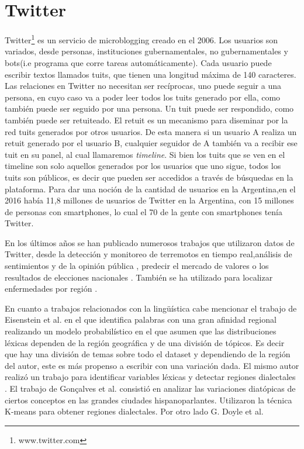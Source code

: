 \section{Twitter}
Twitter\footnote{www.twitter.com} es un servicio de microblogging creado en el 2006. Los usuarios son variados, desde personas, instituciones gubernamentales, no gubernamentales y bots(i.e programa que corre tareas automáticamente). Cada usuario puede escribir textos llamados tuits, que tienen una longitud máxima de 140 caracteres. Las relaciones en Twitter no necesitan ser recíprocas, uno puede seguir a una persona, en cuyo caso va a poder leer todos los tuits generado por ella, como también puede ser seguido por una persona. Un tuit puede ser respondido, como también puede ser retuiteado. El retuit es un mecanismo para diseminar por la red tuits generados por otros usuarios. De esta manera si un usuario A realiza un retuit generado por el usuario B, cualquier seguidor de A también va a recibir ese tuit en su panel, al cual llamaremos \textit{timeline}. Si bien los tuits que se ven en el timeline son solo aquellos generados por los usuarios que uno sigue, todos los tuits son públicos, es decir que pueden ser accedidos a través de búsquedas en la plataforma.
Para dar una noción de la cantidad de usuarios en la Argentina,en el 2016 había 11,8 millones de usuarios de Twitter en la Argentina, con 15 millones de personas con smartphones, lo cual el 70 de la gente con smartphones tenía Twitter.%

En los últimos años se han publicado numerosos trabajos que utilizaron datos de Twitter, desde la detección y monitoreo de terremotos en tiempo real\cite{sakaki2010earthquake},análisis de sentimientos y de la opinión pública \cite{liu2012sentiment},  predecir el mercado de valores \cite{pak2010twitter} o los resultados de elecciones nacionales \cite{tumasjan2010predicting}. También se ha utilizado para localizar enfermedades por región \cite{paul2011you}.

En cuanto a trabajos relacionados con la lingüística cabe mencionar el trabajo de Eisenstein et al. \cite{eisenstein2010latent} en el que identifica palabras con una gran afinidad regional realizando un modelo probabilístico en el que asumen que las distribuciones léxicas dependen de la región geográfica y de una división de tópicos. Es decir que hay una división de temas sobre todo el dataset y dependiendo de la región del autor, este es más propenso a escribir con una variación dada. El mismo autor realizó un trabajo para identificar variables léxicas y detectar regiones dialectales \cite{eisenstein2014identifying}.
El trabajo de Gonçalves et al.\cite{gonccalves2014crowdsourcing} consistió en analizar las variaciones diatópicas de ciertos conceptos en las grandes ciudades hispanoparlantes. Utilizaron la técnica K-means \cite{bishop2006pattern} para obtener regiones dialectales. Por otro lado G. Doyle et al. \cite{doyle2014mapping} 

